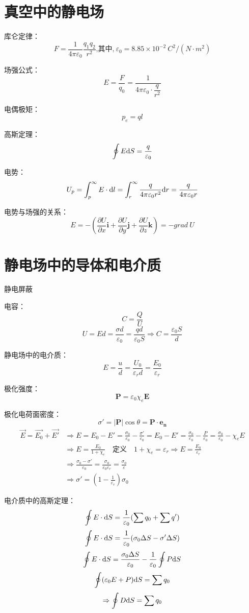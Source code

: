 \section{真空中的静电场}

库仑定律：
$$\displaystyle F=\frac{1}{4\pi\varepsilon_0}\frac{q_1q_2}{r^2}
\text{,其中,}\ \varepsilon_0=8.85\times 10^{-2}\ C^2/(N\cdot m^2)$$

场强公式：
$$\displaystyle E=\frac{F}{q_0}=\frac{1}{4\pi \varepsilon_0 \cdot \dfrac{q}{r^2}}$$

电偶极矩：
$$
p_e=ql
$$

高斯定理：
$$
\oint E \mathrm{d} S = \frac{q}{\varepsilon_0}
$$

电势：
$$
U_p=\int_{p}^{\infty}E\cdot\mathrm{d} l =\int_{r}^{\infty}\frac{q}{4\pi \varepsilon_0 r^2}\mathrm{d} r
=\frac{q}{4\pi \varepsilon_0 r}
$$

电势与场强的关系：
$$
E=-(\frac{\partial U}{\partial x}\boldsymbol{i}+\frac{\partial U}{\partial y}\boldsymbol{j}+\frac{\partial U}{\partial z}\boldsymbol{k})
=-grad \ U
$$

\newpage

\section{静电场中的导体和电介质}

静电屏蔽

电容：
$$
C=\frac{Q}{U}
$$
$$
U=Ed=\frac{\sigma d}{\varepsilon_0 }=\frac{qd}{\varepsilon_0S}\Rightarrow C=\frac{\varepsilon_0S}{d}
$$

静电场中的电介质：
$$
E=\frac{u}{d}=\frac{U_0}{\varepsilon_r d}=\frac{E_0}{\varepsilon_r}
$$

极化强度：
$$
\boldsymbol{P}=\varepsilon_0 \chi_e \boldsymbol{E}
$$

极化电荷面密度：
$$
\sigma ' =\left| \boldsymbol{P}\right| \cos \theta=\boldsymbol{P}\cdot \boldsymbol{e_n}
$$
$$
\begin{aligned}
    \vec{E}=\vec{E_0}+\vec{E'}
    &\Rightarrow E=E_0-E'=\frac{\sigma_0 }{\varepsilon_0}-\frac{\sigma'}{\varepsilon_0}
    =E_0-E'=\frac{\sigma_0 }{\varepsilon_0}-\frac{P}{\varepsilon_0}=\frac{\sigma_0}{\varepsilon_0}-\chi_e E \\
    &\Rightarrow E =\frac{E_0}{1+\chi_e}\quad \text{定义}\quad 1+\chi_e=\varepsilon_r \Rightarrow E=\frac{E_0}{\varepsilon_r}\\
    &\Rightarrow \frac{\sigma_0-\sigma'}{\varepsilon_0}=\frac{\sigma_0}{\varepsilon_0 \varepsilon_r}=\frac{\sigma_0}{\varepsilon}\\
    &\Rightarrow \sigma'=(1-\frac{1}{\varepsilon_r})\sigma_0
\end{aligned}
$$

电介质中的高斯定理：
$$
\oint E\cdot \mathrm{d} S = \frac{1}{\varepsilon_0} (\sum q_0+\sum q')\\
$$
$$
\oint E\cdot \mathrm{d} S = \frac{1}{\varepsilon_0}(\sigma_0\Delta S - \sigma'\Delta S)\\
$$
$$
\oint E\cdot \mathrm{d} S = \frac{\sigma_0\Delta S}{\varepsilon_0} - \frac{1}{\varepsilon_0} \oint P \mathrm{d} S\\
$$
$$
\oint (\varepsilon_0E+P)\mathrm{d} S = \sum q_0\\
$$
$$
\Rightarrow \oint D \mathrm{d} S =\sum q_0
$$